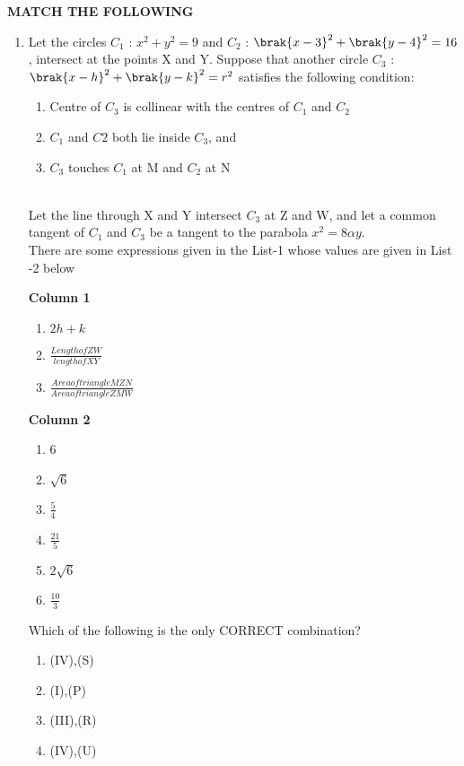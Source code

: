 \documentclass[journal,12pt,twocolumn]{IEEEtran}
\theoremstyle{remark}
\begin{document}
\textbf{MATCH THE FOLLOWING}\\


\begin{enumerate}
\item Let the circles $C_{1}$ : $x^2+y^2=9$ and $C_{2}$ : $\brak{x-3}^2+\brak{y-4}^2 = 16$, intersect at the points X and Y. Suppose that another circle $C_{3}$ : $\brak{x-h}^2+\brak{y-k}^2=r^2$ satisfies the following condition:\\
 
 
 \begin{enumerate}[label=(\roman*)]
 \item Centre of $C_{3}$ is collinear with the centres of $C_{1}$ and $C_{2}$
 \item $C_{1}$ and $C{2}$ both lie inside $C_{3}$, and

 \item $C_{3}$ touches $C_{1}$ at M and $C_{2}$ at N
\end{enumerate}\\
Let the line through X and Y intersect $C_{3}$ at Z and W, and let a common tangent of $C_{1}$ and $C_{3}$ be a tangent to the parabola $x^2=8\alpha y.$\\

There are some expressions given in the List-1 whose values are given in List -2 below
\begin{multicols}

\textbf{Column 1}
\begin{enumerate}[label=(\Alph*)]           
\item $2h+k$                                  
\item $\frac{Length of ZW}{length of XY}$     
\item $\frac{Area of triangle MZN}{Area of triangle ZMW}$                     \end{enumerate}                              
\columnbreak
 \textbf{Column 2}
 \begin{enumerate}[label=(\alph*) , start=16]
 \item 6
 \item $\sqrt{6}$
 \item $\frac{5}{4}$                           
 \item $\frac{21}{5}$                          
 \item $2\sqrt{6}$                             
 \item $\frac{10}{3}$                         
 \end{enumerate}
 \end{multicols}
 Which of the following is the only CORRECT combination?                                    
\begin{enumerate}[label=(\alph*)]            
 \item (IV),(S)
 \item (I),(P)
 \item (III),(R)    
 \item (IV),(U)
 \end{enumerate}



\end{enumerate}
\end{document}
